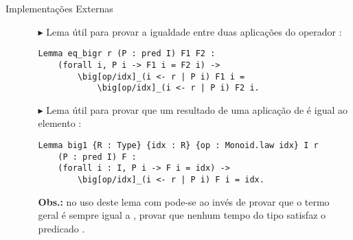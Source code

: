 \begin{frame}[fragile]{Implementações Externas}
    \begin{itemize}
        \item[]
        \begin{itemize}
                
            \item[$\blacktriangleright$] Lema  útil para provar a igualdade entre duas aplicações do operador :
                \begin{lstlisting}[language=coq,frame=single,tabsize=1]
Lemma eq_bigr r (P : pred I) F1 F2 : 
    (forall i, P i -> F1 i = F2 i) ->
        \big[op/idx]_(i <- r | P i) F1 i = 
            \big[op/idx]_(i <- r | P i) F2 i.
                \end{lstlisting}

            \item [$\blacktriangleright$] Lema  útil para provar que um resultado de uma aplicação de  é igual ao elemento :
                \begin{lstlisting}[language=coq,frame=single,tabsize=1]
Lemma big1 {R : Type} {idx : R} {op : Monoid.law idx} I r 
    (P : pred I) F :
    (forall i : I, P i -> F i = idx) -> 
        \big[op/idx]_(i <- r | P i) F i = idx.
                \end{lstlisting}
            \textbf{Obs.:} no uso deste lema com  pode-se ao invés de provar que o termo geral é sempre igual a , provar que nenhum tempo do tipo  satisfaz o predicado .
                
        \end{itemize}
    \end{itemize}
\end{frame}

